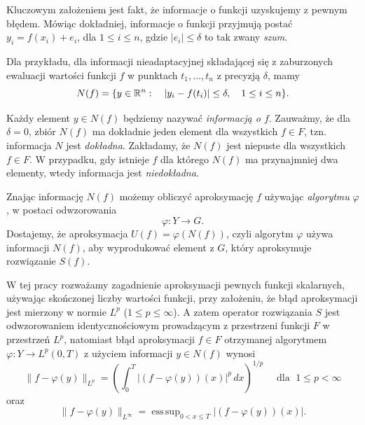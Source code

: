 \documentclass[oik, pdftex, man]{mgrwms}
\DeclareMathOperator*{\esssup}{ess\,sup}
\begin{document}
    Kluczowym założeniem jest fakt, że informacje o funkcji uzyskujemy z pewnym błędem. Mówiąc dokładniej, informacje o funkcji przyjmują postać $y_{i} = f(x_{i}) + e_{i}$, dla $1 \leq i \leq n$, gdzie $|e_{i}| \leq \delta$ to tak zwany \textit{szum}.
    
    Dla przykładu, dla informacji nieadaptacyjnej składającej się z zaburzonych ewaluacji wartości funkcji $f$ w punktach $t_{1}, \dots, t_{n}$ z precyzją $\delta$, mamy
    \begin{equation*}
        N(f) = \{y \in \mathbb{R}^{n} : \quad |y_{i} - f(t_{i})| \leq \delta, \quad 1 \leq i \leq n\}.
    \end{equation*}
    
    Każdy element $y \in N(f)$ będziemy nazywać \textit{informacją o $f$}. Zauważmy, że dla $\delta = 0$, zbiór $N(f)$ ma dokładnie jeden element dla wszystkich $f \in F$, tzn. informacja $N$ jest \textit{dokładna}. Zakładamy, że $N(f)$ jest niepuste dla wszystkich $f \in F$. W przypadku, gdy istnieje $f$ dla którego $N(f)$ ma przynajmniej dwa elementy, wtedy informacja jest \textit{niedokładna}.

    Znając informację $N(f)$ możemy obliczyć aproksymację $f$ używając \textit{algorytmu} $\varphi$, w postaci odwzorowania
    \begin{equation*}
        \varphi : Y \rightarrow G.
    \end{equation*}
    Dostajemy, że aproksymacja $U(f) = \varphi(N(f))$, czyli algorytm $\varphi$ używa informacji $N(f)$, aby wyprodukować element z $G$, który aproksymuje rozwiązanie $S(f)$.

    W tej pracy rozważamy zagadnienie aproksymacji pewnych funkcji skalarnych, używając skończonej liczby wartości funkcji, przy założeniu, że błąd aproksymacji jest mierzony w normie $L^{p}$ ($1 \leq p \leq \infty$). A zatem operator rozwiązania $S$ jest odwzorowaniem identycznościowym prowadzącym z przestrzeni funkcji $F$ w przestrzeń $L^{p}$, natomiast błąd aproksymacji $f \in F$ otrzymanej algorytmem $\varphi : Y \rightarrow L^{p}(0,T)$ z użyciem informacji $y \in N(f)$ wynosi
    \begin{equation*}
        \|f-\varphi(y)\|_{L^p} = \left( \int_{0}^{T} |(f-\varphi(y))(x)|^p \,dx  \right)^{1/p} \quad \text{ dla } \; 1 \leq p < \infty
    \end{equation*}
    oraz
    \begin{equation*}
        \|f-\varphi(y)\|_{L^\infty} = \esssup_{0 < x \leq T} | (f - \varphi(y))(x) |.
    \end{equation*}
\end{document}

